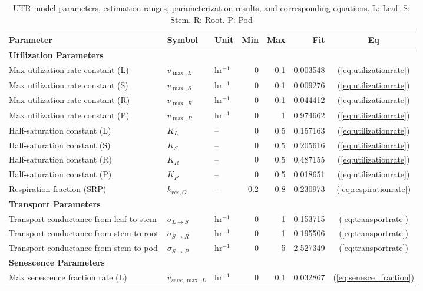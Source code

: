\begin{table}[H]
\caption{UTR model parameters, estimation ranges, parameterization results, and corresponding equations. L: Leaf. S: Stem. R: Root. P: Pod}
\label{tab:utr-param-range-value}
\centering
\begin{tabular}{lllrrrc}
  \toprule
  Parameter & Symbol & Unit & Min & Max & Fit & Eq \\
  \midrule
  \multicolumn{7}{l}{\textbf{Utilization Parameters}} \\
  Max utilization rate constant (L) & $v_{\max,L}$ & hr$^{-1}$ & 0 & 0.1 & 0.003548 & (\ref{eq:utilizationrate}) \\
  Max utilization rate constant (S) & $v_{\max,S}$ & hr$^{-1}$ & 0 & 0.1 & 0.009276 & (\ref{eq:utilizationrate}) \\
  Max utilization rate constant (R) & $v_{\max,R}$ & hr$^{-1}$ & 0 & 0.1 & 0.044412 & (\ref{eq:utilizationrate}) \\
  Max utilization rate constant (P) & $v_{\max,P}$ & hr$^{-1}$ & 0 & 1 & 0.974662 & (\ref{eq:utilizationrate}) \\
  Half-saturation constant (L) & $K_{L}$ & -- & 0 & 0.5 & 0.157163 & (\ref{eq:utilizationrate}) \\
  Half-saturation constant (S) & $K_{S}$ & -- & 0 & 0.5 & 0.205616 & (\ref{eq:utilizationrate}) \\
  Half-saturation constant (R) & $K_{R}$ & -- & 0 & 0.5 & 0.487155 & (\ref{eq:utilizationrate}) \\
  Half-saturation constant (P) & $K_{P}$ & -- & 0 & 0.5 & 0.018651 & (\ref{eq:utilizationrate}) \\
  Respiration fraction (SRP) & $k_{res,O}$ & -- & 0.2 & 0.8 & 0.230973 & (\ref{eq:respirationrate}) \\
  \multicolumn{7}{l}{\textbf{Transport Parameters}} \\
  Transport conductance from leaf to stem & $\sigma_{L \to S}$ & hr$^{-1}$ & 0 & 1 & 0.153715 & (\ref{eq:transportrate}) \\
  Transport conductance from stem to root & $\sigma_{S \to R}$ & hr$^{-1}$ & 0 & 1 & 0.195506 & (\ref{eq:transportrate}) \\
  Transport conductance from stem to pod & $\sigma_{S \to P}$ & hr$^{-1}$ & 0 & 5 & 2.527349 & (\ref{eq:transportrate}) \\
  \multicolumn{7}{l}{\textbf{Senescence Parameters}} \\
  Max senescence fraction rate (L) & $v_{sene,\max,L}$ & hr$^{-1}$ & 0 & 0.1 & 0.032867 & (\ref{eq:senesce_fraction}) \\

\end{tabular}
\end{table}
